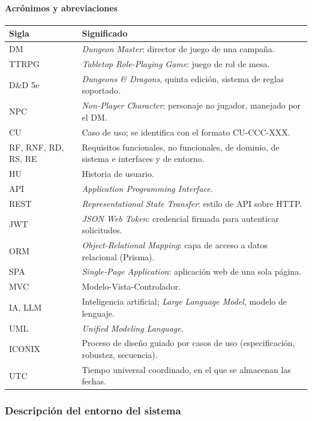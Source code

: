 \paragraph{Acrónimos y abreviaciones}
{\small\setlength{\tabcolsep}{4pt}
\begin{longtable}{|>{\raggedright\arraybackslash}p{3.2cm}|>{\raggedright\arraybackslash}p{12.0cm}|}
\hline
\textbf{Sigla} & \textbf{Significado} \\ \hline\endhead
DM & \textit{Dungeon Master}: director de juego de una campaña. \\ \hline
TTRPG & \textit{Tabletop Role-Playing Game}: juego de rol de mesa. \\ \hline
D\&D 5e & \textit{Dungeons \& Dragons}, quinta edición, sistema de reglas soportado. \\ \hline
NPC & \textit{Non-Player Character}: personaje no jugador, manejado por el DM. \\ \hline
CU & Caso de uso; se identifica con el formato CU-CCC-XXX. \\ \hline
RF, RNF, RD, RS, RE & Requisitos funcionales, no funcionales, de dominio, de sistema e interfaces y de entorno. \\ \hline
HU & Historia de usuario. \\ \hline
API & \textit{Application Programming Interface}. \\ \hline
REST & \textit{Representational State Transfer}: estilo de API sobre HTTP. \\ \hline
JWT & \textit{JSON Web Token}: credencial firmada para autenticar solicitudes. \\ \hline
ORM & \textit{Object-Relational Mapping}: capa de acceso a datos relacional (Prisma). \\ \hline
SPA & \textit{Single-Page Application}: aplicación web de una sola página. \\ \hline
MVC & Modelo-Vista-Controlador. \\ \hline
IA, LLM & Inteligencia artificial; \textit{Large Language Model}, modelo de lenguaje. \\ \hline
UML & \textit{Unified Modeling Language}. \\ \hline
ICONIX & Proceso de diseño guiado por casos de uso (especificación, robustez, secuencia). \\ \hline
UTC & Tiempo universal coordinado, en el que se almacenan las fechas. \\ \hline
\end{longtable}}
\subsubsection{Descripción del entorno del sistema}
